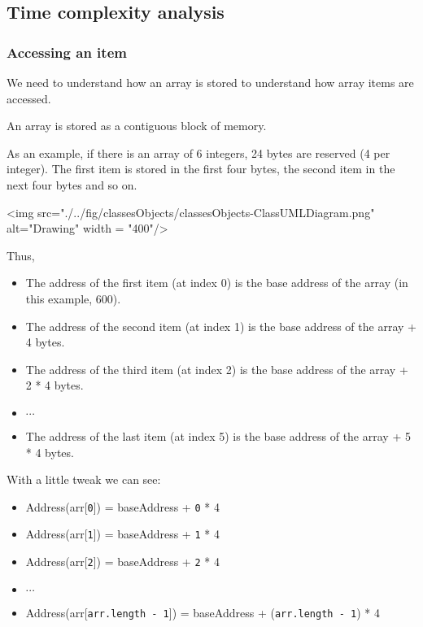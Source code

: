 \newpage

\subsection{Time complexity analysis}

\subsubsection{Accessing an item}

We need to understand how an array is stored to understand how array items are accessed.

An array is stored as a contiguous block of memory. 

As an example, if there is an array of 6 integers, 24 bytes are reserved (4 per integer). The first item is stored in the first four bytes, the second item in the next four bytes and so on.

<img src="./../fig/classesObjects/classesObjects-ClassUMLDiagram.png" alt="Drawing" width = "400"/>

Thus,
\begin{itemize}
  \item The address of the first item (at index 0) is the base address of the array (in this example, 600).
  \item The address of the second item (at index 1) is the base address of the array + 4 bytes.
  \item The address of the third item (at index 2) is the base address of the array + 2 * 4 bytes.
  \item $\cdots$  
  \item The address of the last item (at index 5) is the base address of the array + 5 * 4 bytes.
\end{itemize}

With a little tweak we can see:

\begin{itemize}
  \item Address(arr[\texttt{0}]) = baseAddress + \texttt{0} * 4
  \item Address(arr[\texttt{1}]) = baseAddress + \texttt{1} * 4
  \item Address(arr[\texttt{2}]) = baseAddress + \texttt{2} * 4
  \item $\cdots$  
  \item Address(arr[\texttt{arr.length - 1}]) = baseAddress + (\texttt{arr.length - 1}) * 4
\end{itemize}

